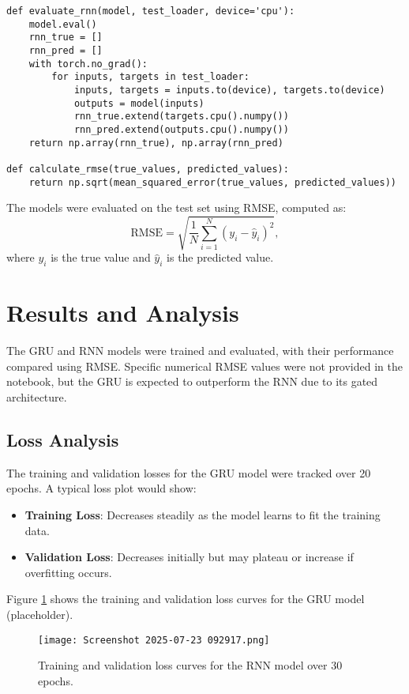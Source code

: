 \documentclass{article}
\begin{document}
\begin{lstlisting}
def evaluate_rnn(model, test_loader, device='cpu'):
    model.eval()
    rnn_true = []
    rnn_pred = []
    with torch.no_grad():
        for inputs, targets in test_loader:
            inputs, targets = inputs.to(device), targets.to(device)
            outputs = model(inputs)
            rnn_true.extend(targets.cpu().numpy())
            rnn_pred.extend(outputs.cpu().numpy())
    return np.array(rnn_true), np.array(rnn_pred)

def calculate_rmse(true_values, predicted_values):
    return np.sqrt(mean_squared_error(true_values, predicted_values))
\end{lstlisting}

The models were evaluated on the test set using RMSE, computed as:
\[
\text{RMSE} = \sqrt{\frac{1}{N} \sum_{i=1}^N (y_i - \hat{y}_i)^2},
\]
where \( y_i \) is the true value and \( \hat{y}_i \) is the predicted value.

\section{Results and Analysis}
The GRU and RNN models were trained and evaluated, with their performance compared using RMSE. Specific numerical RMSE values were not provided in the notebook, but the GRU is expected to outperform the RNN due to its gated architecture.

\subsection{Loss Analysis}
The training and validation losses for the GRU model were tracked over 20 epochs. A typical loss plot would show:
\begin{itemize}
    \item \textbf{Training Loss}: Decreases steadily as the model learns to fit the training data.
    \item \textbf{Validation Loss}: Decreases initially but may plateau or increase if overfitting occurs.
\end{itemize}
Figure \ref{fig:loss} shows the training and validation loss curves for the GRU model (placeholder).

\begin{figure}[h]
    \centering
    \texttt{[image: Screenshot 2025-07-23 092917.png]}
    \caption{Training and validation loss curves for the RNN model over 30 epochs.}
    \label{fig:loss}
\end{figure}
\end{document}

